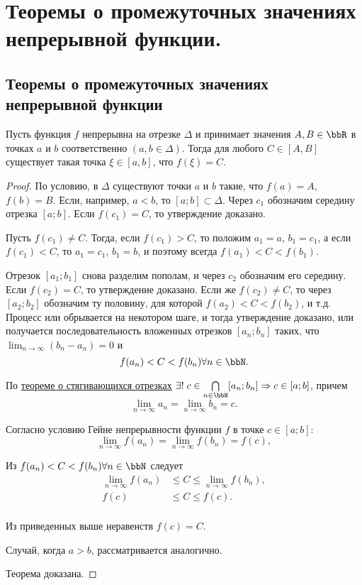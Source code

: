 \chapter{Теоремы о промежуточных значениях непрерывной функции.}
\section{Теоремы о промежуточных значениях непрерывной функции}

\begin{thm}  \label{ch3n2}
Пусть функция $f$ непрерывна на отрезке $\Delta$ и принимает значения $A,B \in \bbR$ в точках $a$ и $b$ соответственно $(a,b \in \Delta )$. Тогда для любого $C\in[A,B]$ существует такая точка $\xi \in [a,b]$, что $f(\xi)=C$.
\end{thm}
\begin{proof}
По условию, в $\Delta$ существуют точки $a$ и $b$ такие, что $f(a) = A$, $f(b) = B$. Если, например, $a < b$, то $[a; b] \subset \Delta$.
Через $c_1$ обозначим середину отрезка $[a;b]$. Если $f(c_1) = C$, то утверждение доказано.

Пусть $f(c_1)\ne C$. Тогда, если $f(c_1) > C$, то положим $a_1 = a$, $b_1 = c_1$, а если $f(c_1) < C$, то $a_1 = c_1$, $b_1 = b$, и поэтому всегда $f(a_1)<C<f(b_1)$.

Отрезок $[a_1; b_1]$ снова разделим пополам, и через $c_2$ обозначим его середину. Если $f(c_2) = C$, то утверждение доказано. Если же $f(c_2) \ne C$, то через $[a_2;b_2]$ обозначим ту половину, для которой $f(a_2) < C < f(b_2)$, и т.д. Процесс или обрывается на некотором шаге, и тогда утверждение доказано, или получается последовательность вложенных отрезков $[a_n;b_n]$ таких, что $\lim_{n \to \infty}\limits(b_n-a_n)=0$ и
$$
f(a_n)<C<f(b_n) \forall n\in \bbN.
$$

По \hyperref[th:ch1:poslstyag]{теореме о стягивающихся отрезках} $\exists!\; c \in \bigcap_{n \in \bbN}\limits[a_n;b_n] \Rightarrow c\in [a;b]$, причем 
$$
\lim_{n \to \infty}a_n = \lim_{n \to \infty}b_n = c.
$$

Согласно условию Гейне непрерывности функции $f$ в точке $c\in[a;b]$:
$$
\lim_{n \to \infty}f(a_n) = \lim_{n \to \infty}f(b_n) = f(c),
$$

Из $f(a_n)<C<f(b_n) \forall n\in\bbN$ следует 
\begin{equation*}
\begin{split}
\lim_{n \to \infty}f(a_n) &\le C \le \lim_{n \to \infty}f(b_n),\\
f(c)&\le C\le f(c).\\
\end{split}
\end{equation*}

Из приведенных выше неравенств $f(c)=C$.

Случай, когда $a > b$, рассматривается аналогично. 

Теорема доказана.
\end{proof}

